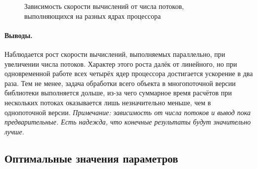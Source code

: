 \documentclass[a4paper, 14pt, titlepage]{extarticle}
\newcommand{\note}[1]{\textit{Примечание: #1}}
\begin{document}
        \begin{figure}[!htb]
          \centering
          \caption{Зависимость скорости вычислений от числа потоков, выполняющихся на разных ядрах процессора}
          \label{fig:thread-plots}
        \end{figure}

        \paragraph{Выводы.}
        Наблюдается рост скорости вычислений, выполняемых параллельно, при увеличении числа потоков.
        Характер этого роста далёк от линейного, но при одновременной работе всех четырёх
        ядер процессора достигается ускорение в два раза. Тем не менее, задача обработки всего
        объекта в многопоточной версии библиотеки выполняется дольше, из-за чего суммарное время
        расчётов при нескольких потоках оказывается лишь незначительно меньше, чем в однопоточной
        версии.
        \note{зависимость от числа потоков и вывод пока предварительные. Есть надежда, что конечные
        результаты будут значительно лучше.}

    \subsection{Оптимальные значения параметров}\label{ssec:optimal_parameters}
\end{document}
